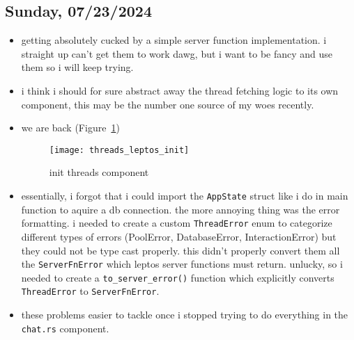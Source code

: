 \subsection*{Sunday, 07/23/2024}
\begin{itemize}
    \item getting absolutely cucked by a simple server function implementation.
        i straight up can't get them to work dawg, but i want to be fancy and
        use them so i will keep trying.
    \item i think i should for sure abstract away the thread fetching logic to
        its own component, this may be the number one source of my woes
        recently.
    \item we are back (Figure~\ref{fig:threads_leptos_init})
        \begin{figure}[ht]
            \centering
            \texttt{[image: threads\_leptos\_init]}
            \captionsetup{labelfont=bf, textfont=it}
            \caption{init threads component}
            \label{fig:threads_leptos_init}
        \end{figure}
    \item essentially, i forgot that i could import the \texttt{AppState} 
        struct like i do in main function to aquire a db connection. the more 
        annoying thing was the error formatting. i needed to create a custom 
        \texttt{ThreadError} enum to
        categorize different types of errors (PoolError, DatabaseError,
        InteractionError) but they could not be type cast properly. this didn't
        properly convert them all the \texttt{ServerFnError} which leptos server
        functions must return. unlucky, so i needed to create a
        \texttt{to_server_error()} function which explicitly converts
        \texttt{ThreadError} to \texttt{ServerFnError}.
    \item these problems easier to tackle once i stopped trying to do everything
        in the \texttt{chat.rs} component.
\end{itemize}
